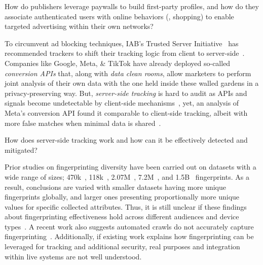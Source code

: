 \begin{opbox}
How do publishers leverage paywalls to build first-party profiles, and how do they associate authenticated users with online behaviors (\eg{}, shopping) to enable targeted advertising within their own networks?
\end{opbox}


%
To circumvent ad blocking techniques, IAB's Trusted Server Initiative~\cite{iabtechlabTechLabTrusted2025} has recommended trackers to shift their tracking logic from client to server-side~\cite{fisherImprovePerformanceSecurity2020}.
%
Companies like Google, Meta, \& TikTok have already deployed so-called \textit{conversion APIs} that, along with \textit{data clean rooms}, allow marketers to perform joint analysis of their own data with the one held inside these walled gardens in a privacy-preserving way.
%
But, \textit{server-side tracking} is hard to audit as APIs and signals become undetectable by client-side mechanisms~\cite{fouadDevilDetailsDetection2024}, yet, an analysis of Meta's conversion API found it comparable to client-side tracking, albeit with more false matches when minimal data is shared~\cite{fraihiClientsideServersideTracking2024}.
\begin{opbox}
How does server-side tracking work and how can it be effectively detected and mitigated?
\end{opbox}



Prior studies on fingerprinting diversity have been carried out on datasets with a wide range of sizes; 470k~\cite{eckersleyHowUniqueYour2010}, 118k~\cite{laperdrixBeautyBeastDiverting2016}, 2.07M~\cite{gomez-boixHidingCrowdAnalysis2018}, 7.2M~\cite{liWhoTouchedMy2020}, and 1.5B~\cite{wuHimManyFaces2023} fingerprints. As a result, conclusions are varied with smaller datasets having more unique fingerprints globally, and larger ones presenting proportionally more unique values for specific collected attributes. Thus, it is still unclear if these findings about fingerprinting effectiveness hold across different audiences and device types~\cite{berkeHowUniqueWhose2025}. A recent work also suggests automated crawls do not accurately capture fingerprinting~\cite{muthu2025beyond}. Additionally, if existing work explains how fingerprinting can be leveraged for tracking and additional security, real purposes and integration within live systems are not well understood.

